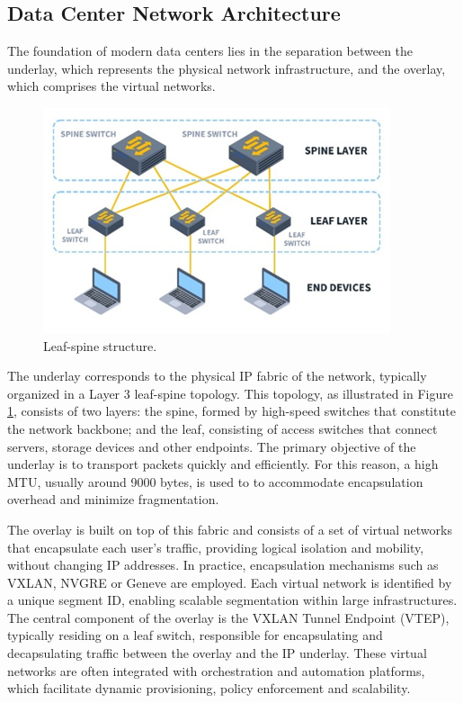 \subsection{Data Center Network Architecture}
The foundation of modern data centers lies in the separation between the underlay, which represents the physical network infrastructure, and the overlay, which comprises the virtual networks. 
\newpage
\begin{figure}
    \centering
    \vspace{-5pt}
    \includegraphics[width=0.9\linewidth]{Figures/LeafSpine.png}
    \caption{Leaf-spine structure.}
    \label{leafSpine}
\end{figure}

The underlay corresponds to the physical IP fabric of the network, typically organized in a Layer 3 leaf-spine topology. This topology, as illustrated in Figure \ref{leafSpine}, consists of two layers: the spine, formed by high-speed switches that constitute the network backbone; and the leaf, consisting of access switches that connect servers, storage devices and other endpoints. The primary objective of the underlay is to transport packets quickly and efficiently. For this reason, a high MTU, usually around 9000 bytes, is used to to accommodate encapsulation overhead and minimize fragmentation. 

The overlay is built on top of this fabric and consists of a set of virtual networks that encapsulate each user's traffic, providing logical isolation and mobility, without changing IP addresses. In practice, encapsulation mechanisms such as VXLAN, NVGRE or Geneve are employed. Each virtual network is identified by a unique segment ID, enabling scalable segmentation within large infrastructures. The central component of the overlay is the VXLAN Tunnel Endpoint (VTEP), typically residing on a leaf switch, responsible for encapsulating and decapsulating traffic between the overlay and the IP underlay. These virtual networks are often integrated with orchestration and automation platforms, which facilitate dynamic provisioning, policy enforcement and scalability. 

